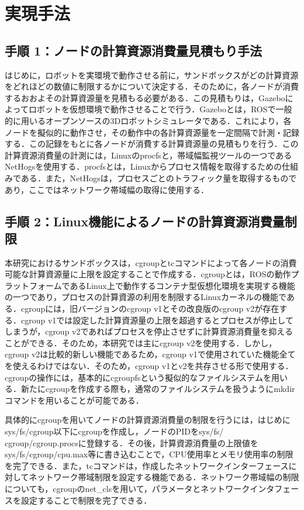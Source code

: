 \documentclass[11pt]{ujarticle} %
\begin{document}
\section{実現手法}
\subsection{手順 1：ノードの計算資源消費量見積もり手法}
はじめに，ロボットを実環境で動作させる前に，サンドボックスがどの計算資源をどれほどの数値に制限するかについて決定する．そのために，各ノードが消費するおおよその計算資源量を見積もる必要がある．この見積もりは，Gazebo\cite{Gazebo}によってロボットを仮想環境で動作させることで行う．Gazeboとは，ROSで一般的に用いるオープンソースの3Dロボットシミュレータである．これにより，各ノードを擬似的に動作させ，その動作中の各計算資源量を一定間隔で計測・記録する．この記録をもとに各ノードが消費する計算資源量の見積もりを行う．この計算資源消費量の計測には，Linuxのprocfsと，帯域幅監視ツールの一つであるNetHogsを使用する．procfsとは，Linuxからプロセス情報を取得するための仕組みである\cite{procMan}．また，NetHogsは，プロセスごとのトラフィック量を取得するものであり，ここではネットワーク帯域幅の取得に使用する．

\subsection{手順 2：Linux機能によるノードの計算資源消費量制限}
本研究におけるサンドボックスは，cgroupとtcコマンドによって各ノードの消費可能な計算資源量に上限を設定することで作成する．cgroupとは，ROSの動作プラットフォームであるLinux上で動作するコンテナ型仮想化環境を実現する機能の一つであり，プロセスの計算資源の利用を制限するLinuxカーネルの機能である\cite{cgroupMan}．cgroupには，旧バージョンのcgroup v1とその改良版のcgroup v2が存在する．cgroup v1では設定した計算資源量の上限を超過するとプロセスが停止してしまうが，cgroup v2であればプロセスを停止させずに計算資源消費量を抑えることができる．そのため，本研究では主にcgroup v2を使用する．しかし，cgroup v2は比較的新しい機能であるため，cgroup v1で使用されていた機能全てを使えるわけではない．そのため，cgroup v1とv2を共存させる形で使用する．cgroupの操作には，基本的にcgroupfsという擬似的なファイルシステムを用いる．新たにcgroupを作成する際も，通常のファイルシステムを扱うようにmkdirコマンドを用いることが可能である．

具体的にcgroupを用いてノードの計算資源消費量の制限を行うには，はじめにsys/fs/cgroup以下にcgroupを作成し，ノードのPIDをsys/fs/\\cgroup/cgroup.procsに登録する．その後，計算資源消費量の上限値をsys/fs/cgroup/cpu.max等に書き込むことで，CPU使用率とメモリ使用率の制限を完了できる．また，tcコマンドは，作成したネットワークインターフェースに対してネットワーク帯域制限を設定する機能である．ネットワーク帯域幅の制限についても，cgroupのnet\_clsを用いて，パラメータとネットワークインタフェースを設定することで制限を完了できる．
\end{document}
